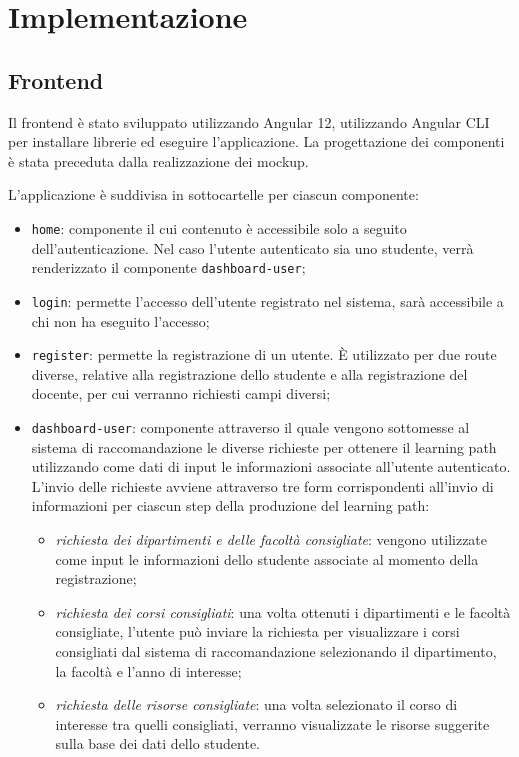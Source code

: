 \clearpage{\pagestyle{empty}\cleardoublepage}
\chapter{Implementazione}                %
\section{Frontend}
Il frontend è stato sviluppato utilizzando Angular 12, utilizzando Angular CLI per installare librerie ed eseguire l'applicazione. La progettazione dei componenti è stata preceduta dalla realizzazione dei mockup.

L'applicazione è suddivisa in sottocartelle per ciascun componente:
\begin{itemize}
	\item \texttt{home}: componente il cui contenuto è accessibile solo a seguito dell'autenticazione. Nel caso l'utente autenticato sia uno studente, verrà renderizzato il componente \texttt{dashboard-user};
	\item \texttt{login}: permette l'accesso dell'utente registrato nel sistema, sarà accessibile a chi non ha eseguito l'accesso;
	\item \texttt{register}: permette la registrazione di un utente. È utilizzato per due route diverse, relative alla registrazione dello studente e alla registrazione del docente, per cui verranno richiesti campi diversi;
	\item \texttt{dashboard-user}: componente attraverso il quale vengono sottomesse al sistema di raccomandazione le diverse richieste per ottenere il learning path utilizzando come dati di input le informazioni associate all'utente autenticato. L'invio delle richieste avviene attraverso tre form corrispondenti all'invio di informazioni per ciascun step della produzione del learning path:
\begin{itemize}
\item \textit{richiesta dei dipartimenti e delle facoltà consigliate}: vengono utilizzate come input le informazioni dello studente associate al momento della registrazione;
\item \textit{richiesta dei corsi consigliati}: una volta ottenuti i dipartimenti e le facoltà consigliate, l'utente può inviare la richiesta per visualizzare i corsi consigliati dal sistema di raccomandazione selezionando il dipartimento, la facoltà e l'anno di interesse;
\item \textit{richiesta delle risorse consigliate}: una volta selezionato il corso di interesse tra quelli consigliati, verranno visualizzate le risorse suggerite sulla base dei dati dello studente.

\end{itemize}
\end{itemize}
